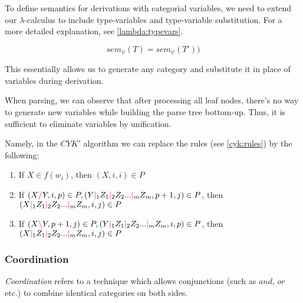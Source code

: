 \documentclass[main.tex]{subfiles}
\begin{document}
To define semantics for derivations with categorial variables, we need to extend
our $\lambda$-calculus to include type-variables and type-variable substitution.
For a more detailed explanation, see \cref{lambda:typevars}.

\begin{center}
\end{center}

\[ sem_{\psi}(T) = sem_{\psi}(T')) \]

This essentially allows us to generate any category and substitute it in place
of variables during derivation.

When parsing, we can observe that after processing all leaf nodes,
there's no way to generate new variables while building the parse tree
bottom-up. Thus, it is sufficient to eliminate variables by unification.

Namely, in the $CYK'$ algorithm we can replace the rules (see \ref{cyk:rules})
by the following:

\begin{enumerate}
    \item If $X \in f(w_i)$, then $(X, i, i) \in P$
    \item If $(X \textcolor{red}{/} Y, i, p) \in P, (Y \textcolor{red}{|}_1 Z_1 \textcolor{red}{|}_2 Z_2 ... \textcolor{red}{|}_m Z_m, p + 1, j) \in P$,
        then $(X \textcolor{red}{|}_1 Z_1 \textcolor{red}{|}_2 Z_2 ... \textcolor{red}{|}_m Z_m, i, j) \in P$
    \item If $(X \textcolor{red}{\backslash} Y, p + 1, j) \in P, (Y \textcolor{red}{|}_1 Z_1 \textcolor{red}{|}_2 Z_2 ... \textcolor{red}{|}_m Z_m, i, p) \in P$,
        then $(X \textcolor{red}{|}_1 Z_1 \textcolor{red}{|}_2 Z_2 ... \textcolor{red}{|}_m Z_m, i, j) \in P$
\end{enumerate}

\subsubsection{Coordination}
\emph{Coordination} refers to a technique which allows conjunctions (such as
$and$, $or$ etc.) to combine identical categories on both sides.
\end{document}
